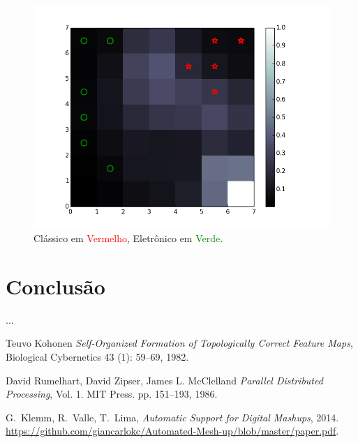 \documentclass[journal]{IEEEtran}
\begin{document}
\begin{figure}[H]
\centering
\includegraphics[scale=0.5]{images/mfccs_classical_eletronic.png}
\caption{Clássico em \textcolor{red}{Vermelho}, Eletrônico em \textcolor{green}{Verde}.}\label{mfccs_classical_eletronic}
\end{figure}

\section{Conclusão}
...

\ifCLASSOPTIONcaptionsoff
  \newpage
\fi

\begin{thebibliography}{1}

Teuvo Kohonen \emph{Self-Organized Formation of Topologically Correct Feature Maps}, Biological Cybernetics 43 (1): 59–69, 1982.

David Rumelhart, David Zipser, James L. McClelland \emph{Parallel Distributed Processing}, Vol. 1. MIT Press. pp. 151–193, 1986.
  
G.~Klemm, R.~Valle, T.~Lima, \emph{Automatic Support for Digital Mashups}, 2014. \href{https://github.com/giancarlokc/Automated-Mesh-up/blob/master/paper.pdf}{https://github.com/giancarlokc/Automated-Mesh-up/blob/master/paper.pdf}. 

\end{thebibliography}
\end{document}
